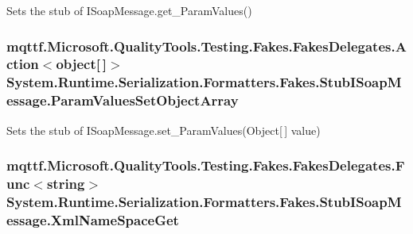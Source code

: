 Sets the stub of I\-Soap\-Message.\-get\-\_\-\-Param\-Values()

\hypertarget{class_system_1_1_runtime_1_1_serialization_1_1_formatters_1_1_fakes_1_1_stub_i_soap_message_a49f13142de20c9cede86ef0e1954d2f4}{
\subsubsection[{Param\-Values\-Set\-Object\-Array}]{\setlength{\rightskip}{0pt plus 5cm}mqttf.\-Microsoft.\-Quality\-Tools.\-Testing.\-Fakes.\-Fakes\-Delegates.\-Action$<$object\mbox{[}$\,$\mbox{]}$>$ System.\-Runtime.\-Serialization.\-Formatters.\-Fakes.\-Stub\-I\-Soap\-Message.\-Param\-Values\-Set\-Object\-Array}}\label{class_system_1_1_runtime_1_1_serialization_1_1_formatters_1_1_fakes_1_1_stub_i_soap_message_a49f13142de20c9cede86ef0e1954d2f4}


Sets the stub of I\-Soap\-Message.\-set\-\_\-\-Param\-Values(\-Object\mbox{[}$\,$\mbox{]} value)

\hypertarget{class_system_1_1_runtime_1_1_serialization_1_1_formatters_1_1_fakes_1_1_stub_i_soap_message_aef1f89c96eb699fe889004c1c59de73a}{
\subsubsection[{Xml\-Name\-Space\-Get}]{\setlength{\rightskip}{0pt plus 5cm}mqttf.\-Microsoft.\-Quality\-Tools.\-Testing.\-Fakes.\-Fakes\-Delegates.\-Func$<$string$>$ System.\-Runtime.\-Serialization.\-Formatters.\-Fakes.\-Stub\-I\-Soap\-Message.\-Xml\-Name\-Space\-Get}}\label{class_system_1_1_runtime_1_1_serialization_1_1_formatters_1_1_fakes_1_1_stub_i_soap_message_aef1f89c96eb699fe889004c1c59de73a}


